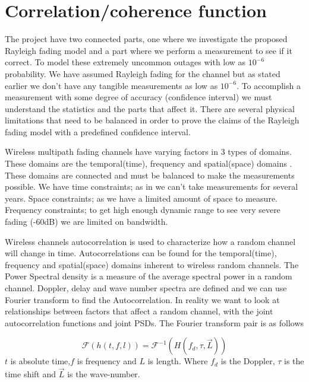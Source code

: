 \section{Correlation/coherence function}

The project have two connected parts, one where we investigate the proposed Rayleigh fading model and a part where we perform a measurement to see if it correct.  To model these extremely uncommon outages with low as $10^{-6}$ probability. We have assumed Rayleigh fading for the channel but as stated earlier we don't have any tangible measurements as low as $10^{-6}$. To accomplish a measurement with some degree of accuracy (confidence interval) we must understand the statistics and the parts that affect it. 
There are several physical limitations that need to be balanced  in order to prove the claims of the Rayleigh fading model with a predefined confidence interval. 

Wireless multipath fading channels have varying factors in 3 types of domains. These domains are the temporal(time), frequency and spatial(space) domains \citep[p. 40-42]{stochasticWirelessChan}. These domains are connected and must be balanced to make the measurements possible. We have time constraints; as in we can't take measurements for several years. Space constraints; as we have a limited amount of space to measure. Frequency constraints; to get high enough dynamic range to see very severe fading (-60dB) we are limited on bandwidth.

Wireless channels autocorrelation is used to characterize how a random channel will change in time. Autocorrelations can be found for the temporal(time), frequency and spatial(space) domains inherent to wireless random channels. The Power Spectral density is a measure of the average spectral power in a random channel. Doppler, delay and wave number spectra are defined and we can use Fourier transform to find the Autocorrelation. In reality we want to look at relationships between factors that affect a random channel, with the joint autocorrelation functions and joint PSDs\citep{SpaceWirelessChan}. The Fourier transform pair is as follows

\begin{equation}
\mathcal{F} ( h(t,f,l) ) =
\mathcal{F}^{-1} ( H(f_d,\tau,\vec{L}) )
\end{equation}
$t$ is absolute time,$f$ is frequency and $L$ is length.
Where $f_d$ is the Doppler, $\tau$ is the time shift and $\vec{L}$ is the wave-number.


